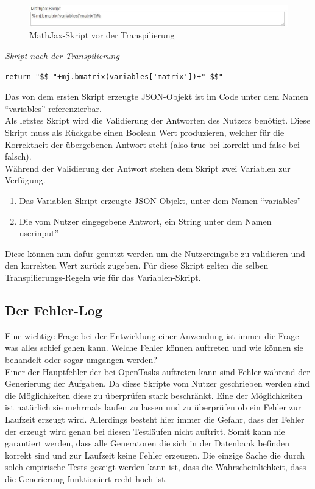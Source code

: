 \begin{figure}[htp]     %
\centering
\includegraphics[width=1\textwidth]{bilder/MathJaxPreTrans} 
\caption[MathJax-Skript vor der Transpilierung]{MathJax-Skript vor der Transpilierung}
\end{figure} 


\emph{Skript nach der Transpilierung}
\begin{lstlisting}
return "$$ "+mj.bmatrix(variables['matrix'])+" $$"
\end{lstlisting}
Das von dem ersten Skript erzeugte JSON-Objekt ist im Code unter dem Namen ``variables'' referenzierbar. \\

Als letztes Skript wird die Validierung der Antworten des Nutzers benötigt. Diese Skript muss als Rückgabe einen Boolean Wert produzieren, welcher für die Korrektheit der übergebenen Antwort steht (also true bei korrekt und false bei falsch). \\
Während der Validierung der Antwort stehen dem Skript zwei Variablen zur Verfügung.\\
\begin{enumerate}
\item Das Variablen-Skript erzeugte JSON-Objekt, unter dem Namen ``variables''
\item Die vom Nutzer eingegebene Antwort, ein String unter dem Namen userinput''
\end{enumerate}

Diese können nun dafür genutzt werden um die Nutzereingabe zu validieren und den korrekten Wert zurück zugeben. Für diese Skript gelten die selben Transpilierungs-Regeln wie für das Variablen-Skript.


\subsection{Der Fehler-Log}

Eine wichtige Frage bei der Entwicklung einer Anwendung ist immer die Frage was alles schief gehen kann. Welche Fehler können auftreten und wie können sie behandelt oder sogar umgangen werden? \\
Einer der Hauptfehler der bei OpenTasks auftreten kann sind Fehler während der Generierung der Aufgaben. Da diese Skripte vom Nutzer geschrieben werden sind die Möglichkeiten diese zu überprüfen stark beschränkt. Eine der Möglichkeiten ist natürlich sie mehrmals laufen zu lassen und zu überprüfen ob ein Fehler zur Laufzeit erzeugt wird. Allerdings besteht hier immer die Gefahr, dass der Fehler der erzeugt wird genau bei diesen Testläufen nicht auftritt. Somit kann nie garantiert werden, dass alle Generatoren die sich in der Datenbank befinden korrekt sind und zur Laufzeit keine Fehler erzeugen. Die einzige Sache die durch solch empirische Tests gezeigt werden kann ist, dass die Wahrscheinlichkeit, dass die Generierung funktioniert recht hoch ist. \\

